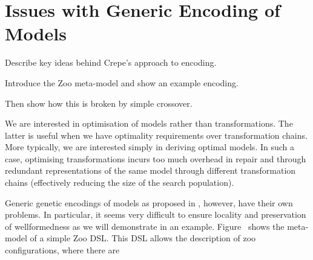 \section{Issues with Generic Encoding of Models}
\label{section:issues}

	\begin{draftlist}
		\item Describe key ideas behind Crepe's approach to encoding. 
		\item Introduce the Zoo meta-model and show an example encoding.
		\item Then show how this is broken by simple crossover.
	\end{draftlist}

  We are interested in optimisation of models rather than transformations. The latter is useful when we have optimality requirements over transformation chains. More
	typically, we are interested simply in deriving optimal models. In such a case, optimising transformations incurs too much overhead in repair and through redundant
	representations of the same model through different transformation chains (effectively reducing the size of the search population).
	
	Generic genetic encodings of models as proposed in \cite{Kessentini+13,Williams13,Efstathiou+14b}, however, have their own problems. In particular, it seems very
	difficult to ensure locality and preservation of wellformedness as we will demonstrate in an example. Figure~ shows the meta-model of a
	simple Zoo DSL. This DSL allows the description of zoo configurations, where there are 
	
